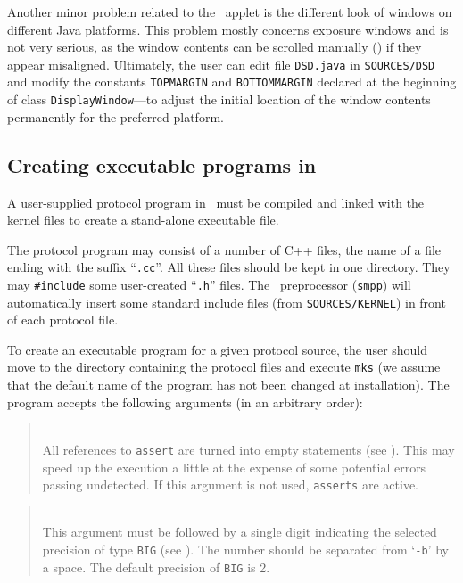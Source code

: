 Another minor problem related to the \dsd\ applet is the different look
of windows on different Java platforms.
This problem mostly concerns exposure windows and is not very serious,
as the window contents can be scrolled manually () if
they appear misaligned.
Ultimately,
the user can edit file {\tt DSD.java} in {\tt SOURCES/DSD} and modify the
constants {\tt TOPMARGIN} and {\tt BOTTOMMARGIN} declared at the
beginning of class {\tt DisplayWindow}---to adjust the initial location
of the window contents permanently for the preferred platform.

\subsection{Creating executable programs in \smurph}
\label{rm_un_cr}

A user-supplied protocol program in \smurph\ must
be compiled and linked with the kernel
files to create a stand-alone executable file.

The protocol program may consist of a number of C++ files, the name of
a file ending with the suffix ``{\tt .cc}''.
All these files should be kept in one directory.
They may {\tt \#include} some user-created ``{\tt .h}'' files.
The \smurph\ preprocessor ({\tt smpp}) will automatically insert some standard
include files (from {\tt SOURCES/KERNEL}) in front of each protocol file.

To create an executable program for a given protocol source, the user
should move to the directory containing the protocol files and execute
{\tt mks} (we assume that the default name of the program has not been
changed at installation).
The program accepts the following arguments (in an arbitrary order):

\medskip

\begin{quote}
\noindent{}\\ \hspace{0in}
All references to {\tt assert} are turned into empty statements
(see ).
This may speed up the execution a little at the expense of some potential
errors passing undetected.
If this argument is not used, {\tt asserts} are active.
\end{quote}

\begin{quote}
\noindent{}\\ \hspace{0in}
This argument must be followed by a single digit indicating the selected
precision of type {\tt BIG} (see ).
The number should be separated from `{\tt -b}' by a space.
The default precision of {\tt BIG} is 2.
\end{quote}

